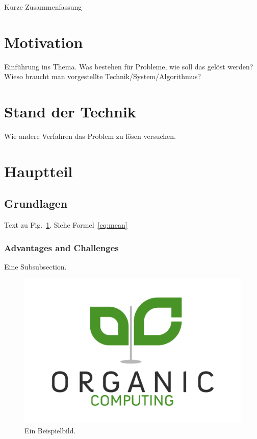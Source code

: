 \documentclass{llncs}
\begin{document}
Kurze Zusammenfassung

 






\newpage

\section{Motivation}
\label{sec:Motivation}
Einführung ins Thema. Was bestehen für Probleme, wie soll das gelöst werden? \\

Wieso braucht man vorgestellte Technik/System/Algorithmus?



\section{Stand der Technik} \label{sec:sdt}
%
Wie andere Verfahren das Problem zu lösen versuchen. \cite{OCBible}

\section{Hauptteil}
\label{sec:Hauptteil}

\subsection{Grundlagen}
\label{sec:Grundlagen}
Text zu Fig.~\ref{fig:abb1}. Siehe Formel~\ref{eq:mean}

\subsubsection{Advantages and Challenges}
Eine Subsubsection.

\begin{figure}[th!]
	\centering
	\includegraphics[width=.8\columnwidth]{./Figures/Organic-Computing.png}
	\caption{Ein Beispielbild.}
	\label{fig:abb1}
\end{figure}
\end{document}
